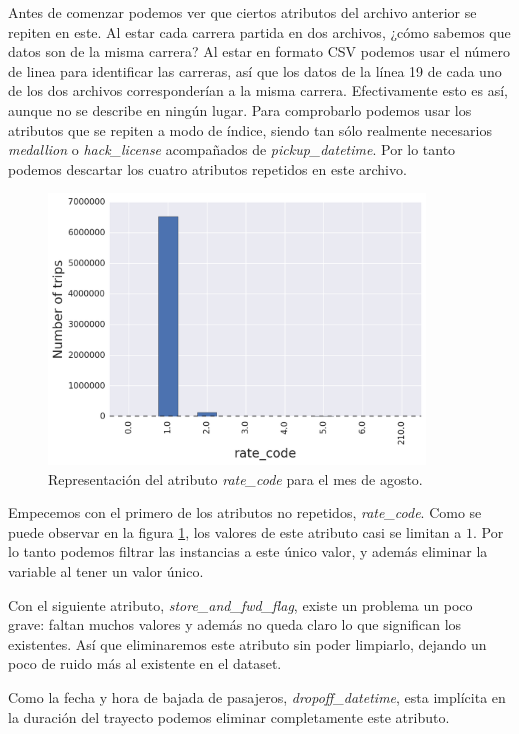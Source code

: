 Antes de comenzar podemos ver que ciertos atributos del archivo anterior se repiten en este. Al estar cada carrera partida en dos archivos, ¿cómo sabemos que datos son de la misma carrera? Al estar en formato CSV podemos usar el número de linea para identificar las carreras, así que los datos de la línea 19 de cada uno de los dos archivos corresponderían a la misma carrera. Efectivamente esto es así, aunque no se describe en ningún lugar. Para comprobarlo podemos usar los atributos que se repiten a modo de índice, siendo tan sólo realmente necesarios \emph{medallion} o \emph{hack\_license} acompañados de \emph{pickup\_datetime}. Por lo tanto podemos descartar los cuatro atributos repetidos en este archivo.

\begin{figure}[ht]
  \centering
  \includegraphics[width=100mm]{figures/ch_05/rate_code.png}
  \caption{Representación del atributo \emph{rate\_code} para el mes de agosto.}
  \label{fig:5.7}
\end{figure}

Empecemos con el primero de los atributos no repetidos, \emph{rate\_code}. Como se puede observar en la figura \ref{fig:5.7}, los valores de este atributo casi se limitan a $1$. Por lo tanto podemos filtrar las instancias a este único valor, y además eliminar la variable al tener un valor único.

Con el siguiente atributo, \emph{store\_and\_fwd\_flag}, existe un problema un poco grave: faltan muchos valores y además no queda claro lo que significan los existentes. Así que eliminaremos este atributo sin poder limpiarlo, dejando un poco de ruido más al existente en el dataset.

Como la fecha y hora de bajada de pasajeros, \emph{dropoff\_datetime}, esta implícita en la duración del trayecto podemos eliminar completamente este atributo.

